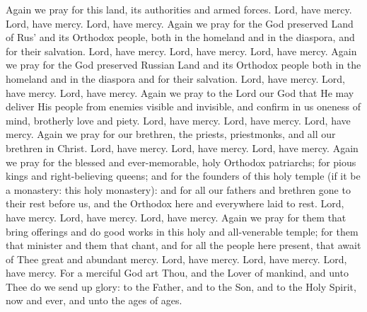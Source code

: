 \begin{liturgicaltext}
    \deacon Again we pray for this land, its authorities and armed forces.
    \choir Lord, have mercy. Lord, have mercy. Lord, have mercy.
    \deacon Again we pray for the God preserved Land of Rus' and its Orthodox people, both in the homeland and in the diaspora, and for their salvation.
    \choir Lord, have mercy. Lord, have mercy. Lord, have mercy.
    \deacon Again we pray for the God preserved Russian Land and its Orthodox people both in the homeland and in the diaspora and for their salvation.
    \choir Lord, have mercy. Lord, have mercy. Lord, have mercy.
    \deacon Again we pray to the Lord our God that He may deliver His people from enemies visible and invisible, and confirm in us oneness of mind, brotherly love and piety.
    \choir Lord, have mercy. Lord, have mercy. Lord, have mercy.
    \deacon Again we pray for our brethren, the priests, priestmonks, and all our brethren in Christ.
    \choir Lord, have mercy. Lord, have mercy. Lord, have mercy.
    \deacon Again we pray for the blessed and ever-memorable, holy Orthodox patriarchs; for pious kings and right-believing queens; and for the founders of this holy temple (if it be a monastery: this holy monastery): and for all our fathers and brethren gone to their rest before us, and the Orthodox here and everywhere laid to rest.
    \choir Lord, have mercy. Lord, have mercy. Lord, have mercy.
    \deacon Again we pray for them that bring offerings and do good works in this holy and all-venerable temple; for them that minister and them that chant, and for all the people here present, that await of Thee great and abundant mercy.
    \choir Lord, have mercy. Lord, have mercy. Lord, have mercy.
    \priest For a merciful God art Thou, and the Lover of mankind, and unto Thee do we send up glory: to the Father, and to the Son, and to the Holy Spirit, now and ever, and unto the ages of ages.
    \choir {}
\end{liturgicaltext}


